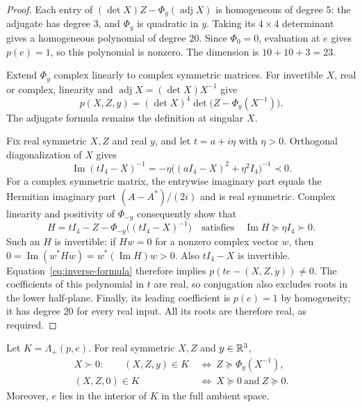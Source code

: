 \begin{proof}
Each entry of $(\det X)Z-\Phi_y(\operatorname{adj}X)$ is homogeneous
of degree $5$: the adjugate has degree $3$, and $\Phi_y$ is quadratic
in $y$.  Taking its $4\times4$ determinant gives a homogeneous
polynomial of degree $20$.  Since $\Phi_0=0$, evaluation at $e$
gives $p(e)=1$, so this polynomial is nonzero.  The dimension is
$10+10+3=23$.

Extend $\Phi_y$ complex linearly to complex symmetric matrices.
For invertible $X$, real or complex, linearity and
$\operatorname{adj}X=(\det X)X^{-1}$ give
\begin{equation}
 p(X,Z,y)=(\det X)^4\det\bigl(Z-\Phi_y(X^{-1})\bigr).
 \label{eq:inverse-formula}
\end{equation}
The adjugate formula remains the definition at singular $X$.

Fix real symmetric $X,Z$ and real $y$, and let $t=a+i\eta$ with
$\eta>0$.  Orthogonal diagonalization of $X$ gives
\[
 \operatorname{Im}(tI_4-X)^{-1}
 =-\eta\bigl((aI_4-X)^2+\eta^2I_4\bigr)^{-1}\prec0.
\]
For a complex symmetric matrix, the entrywise imaginary part equals
the Hermitian imaginary part $(A-A^*)/(2i)$ and is real symmetric.
Complex linearity and positivity of $\Phi_{-y}$ consequently show
that
\[
 H=tI_4-Z-\Phi_{-y}\bigl((tI_4-X)^{-1}\bigr)
 \quad\text{satisfies}\quad
 \operatorname{Im}H\succeq\eta I_4\succ0.
\]
Such an $H$ is invertible: if $Hw=0$ for a nonzero complex vector
$w$, then $0=\operatorname{Im}(w^*Hw)=w^*(\operatorname{Im}H)w>0$.
Also $tI_4-X$ is invertible.  Equation~\eqref{eq:inverse-formula}
therefore implies $p(te-(X,Z,y))\ne0$.
The coefficients of this polynomial in $t$ are real, so conjugation
also excludes roots in the lower half-plane.  Finally, its leading
coefficient is $p(e)=1$ by homogeneity; it has degree $20$ for every
real input.  All its roots are therefore real, as required.
\end{proof}

\begin{proposition}\label{prop:slices}
Let $K=\Lambda_+(p,e)$.  For real symmetric $X,Z$ and $y\in\mathbb R^3$,
\begin{align}
 X\succ0:\qquad
 (X,Z,y)\in K
 &\ \Longleftrightarrow\ 
 Z\succeq\Phi_y(X^{-1}),
 \label{eq:slice-positive}\\
 (X,Z,0)\in K
 &\ \Longleftrightarrow\ 
 X\succeq0\ \text{and}\ Z\succeq0.
 \label{eq:slice-zero}
\end{align}
Moreover, $e$ lies in the interior of $K$ in the full ambient space.
\end{proposition}

